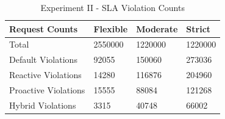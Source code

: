 \begin{table}
    \caption{Experiment II - SLA Violation Counts}\label{tab:exp2-sla-violation-count}
    \centering
    \begin{tabular}{|l|l|l|l|}
        \hline
        Request Counts & Flexible & Moderate & Strict \\
        \hline
        Total  & \num[group-separator={,}]{2550000} & \num[group-separator={,}]{1220000} & \num[group-separator={,}]{1220000} \\
        Default Violations & \num[group-separator={,}]{92055} & \num[group-separator={,}]{150060} & \num[group-separator={,}]{273036} \\
        Reactive Violations & \num[group-separator={,}]{14280} & \num[group-separator={,}]{116876} & \num[group-separator={,}]{204960} \\
        Proactive Violations & \num[group-separator={,}]{15555} & \num[group-separator={,}]{88084} & \num[group-separator={,}]{121268} \\
        Hybrid Violations & \num[group-separator={,}]{3315} & \num[group-separator={,}]{40748} & \num[group-separator={,}]{66002} \\
         \hline
    \end{tabular}
\end{table}
